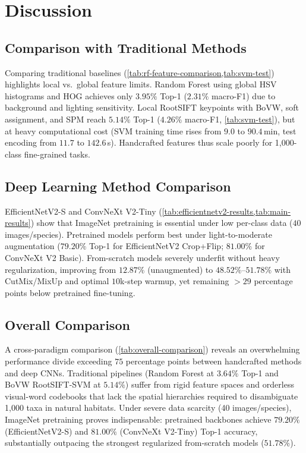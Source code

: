 \section{Discussion}
\label{sec:discussion}

\subsection{Comparison with Traditional Methods}
\label{sec:disc-traditional}
Comparing traditional baselines (\cref{tab:rf-feature-comparison,tab:svm-test}) highlights local vs.\ global feature limits. Random Forest using global HSV histograms and HOG achieves only $3.95\%$ Top-1 ($2.31\%$ macro-F1) due to background and lighting sensitivity. Local RootSIFT keypoints with BoVW, soft assignment, and SPM reach $5.14\%$ Top-1 ($4.26\%$ macro-F1, \cref{tab:svm-test}), but at heavy computational cost (SVM training time rises from $9.0$ to $90.4$\,min, test encoding from $11.7$ to $142.6$\,s). Handcrafted features thus scale poorly for 1,000-class fine-grained tasks.

\subsection{Deep Learning Method Comparison}
\label{sec:disc-dl}
EfficientNetV2-S and ConvNeXt V2-Tiny (\cref{tab:efficientnetv2-results,tab:main-results}) show that ImageNet pretraining is essential under low per-class data ($40$ images/species). Pretrained models perform best under light-to-moderate augmentation ($79.20\%$ Top-1 for EfficientNetV2 Crop+Flip; $81.00\%$ for ConvNeXt V2 Basic). From-scratch models severely underfit without heavy regularization, improving from $12.87\%$ (unaugmented) to $48.52\%$--$51.78\%$ with CutMix/MixUp and optimal $10$k-step warmup, yet remaining $>29$ percentage points below pretrained fine-tuning.

\subsection{Overall Comparison}
\label{sec:disc-overall}
A cross-paradigm comparison (\cref{tab:overall-comparison}) reveals an overwhelming performance divide exceeding $75$ percentage points between handcrafted methods and deep CNNs. Traditional pipelines (Random Forest at $3.64\%$ Top-1 and BoVW RootSIFT-SVM at $5.14\%$) suffer from rigid feature spaces and orderless visual-word codebooks that lack the spatial hierarchies required to disambiguate 1{,}000 taxa in natural habitats. Under severe data scarcity (40 images/species), ImageNet pretraining proves indispensable: pretrained backbones achieve $79.20\%$ (EfficientNetV2-S) and $81.00\%$ (ConvNeXt V2-Tiny) Top-1 accuracy, substantially outpacing the strongest regularized from-scratch models ($51.78\%$).

